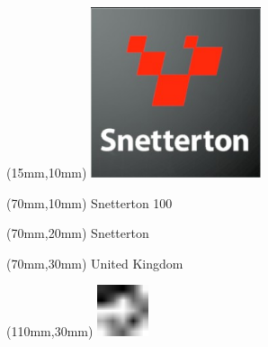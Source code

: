 \null\newpage
\begin{textblock*}{50mm}(15mm,10mm)%
\includegraphics[width=50mm]{LG/2015-05-20_00095.png}
\end{textblock*}
\begin{textblock*}{130mm}(70mm,10mm)%
{\fontsize{20}{20}\selectfont Snetterton 100}\\
\end{textblock*}
\begin{textblock*}{120mm}(70mm,20mm)%
{\fontsize{16}{16}\selectfont Snetterton}\\
\end{textblock*}
\begin{textblock*}{120mm}(70mm,30mm)%
{\fontsize{12}{12}\selectfont United Kingdom}
\end{textblock*}
\begin{textblock*}{30mm}(110mm,30mm)%
\centering
\includegraphics[height=15mm]{icons/fa-rotate-left.pdf}
\end{textblock*}
